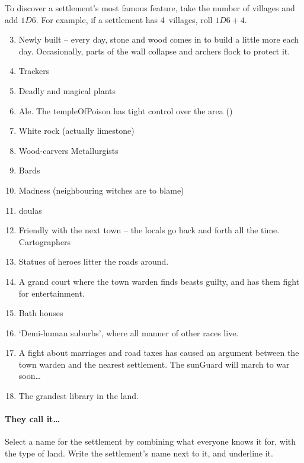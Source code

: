 \begin{multicols}{2}
To discover a settlement's most famous feature, take the number of \glspl{village} and add $1D6$.
For example, if a settlement has 4~\glspl{village}, roll $1D6+4$.

\begin{enumerate}
\setcounter{enumi}{2}
  \item
  Newly built -- every day, stone and wood comes in to build a little more each day.
  Occasionally, parts of the wall collapse and archers flock to protect it.
  \item
  Trackers
  \item
  Deadly and magical plants
  \item
  Ale.
  The \gls{templeOfPoison} has tight control over the area ()
  \item
  White rock (actually limestone)
  \item
  \ifodd\value{r4}
    Wood-carvers
  \else
    Metallurgists
  \fi
  \item
 Bards
  \item
  Madness (neighbouring witches are to blame)
  \item
  \Glspl{doula}
  \item
  \ifodd\value{r4}
  Friendly with the next town -- the locals go back and forth all the
    time.
  \else
    Cartographers
  \fi
  \item
  Statues of heroes litter the roads around.
  \item
  A grand \gls{court} where the town \gls{warden} finds beasts guilty, and has them fight for entertainment.
  \item
  Bath houses
  \item
  `Demi-human suburbs', where all manner of other races live.
  \item
  A fight about marriages and road taxes has caused an argument between the town \gls{warden} and the nearest settlement.
  The \gls{sunGuard} will march to war soon\ldots
  \item
  The grandest library in the land.
\end{enumerate}

\paragraph{They call it\ldots{}}

Select a name for the settlement by combining what everyone knows it for, with the type of land.
Write the settlement's name next to it, and underline it.


\end{multicols}
